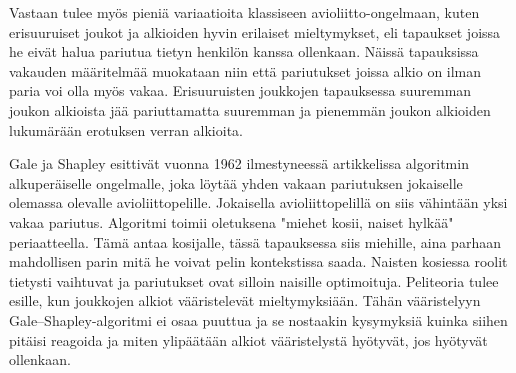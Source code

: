 \documentclass[finnish]{tktltiki2}
\theoremstyle{definition}
\theoremstyle{remark}
\begin{document}
Vastaan tulee myös pieniä variaatioita klassiseen avioliitto-ongelmaan, kuten erisuuruiset joukot ja alkioiden hyvin erilaiset mieltymykset, eli tapaukset joissa he eivät halua pariutua tietyn henkilön kanssa ollenkaan. Näissä tapauksissa vakauden määritelmää muokataan niin että pariutukset joissa alkio on ilman paria voi olla myös vakaa. Erisuuruisten joukkojen tapauksessa suuremman joukon alkioista jää pariuttamatta suuremman ja pienemmän joukon alkioiden lukumärään erotuksen verran alkioita.

Gale ja Shapley esittivät vuonna 1962 ilmestyneessä artikkelissa \cite{gale62a} algoritmin alkuperäiselle ongelmalle, joka löytää yhden vakaan pariutuksen jokaiselle olemassa olevalle avioliittopelille. Jokaisella avioliittopelillä on siis vähintään yksi vakaa pariutus. Algoritmi toimii oletuksena "miehet kosii, naiset hylkää" periaatteella. Tämä antaa kosijalle, tässä tapauksessa siis miehille, aina parhaan mahdollisen parin mitä he voivat pelin kontekstissa saada. Naisten kosiessa roolit tietysti vaihtuvat ja pariutukset ovat silloin naisille optimoituja.
Peliteoria tulee esille, kun joukkojen alkiot vääristelevät mieltymyksiään. Tähän vääristelyyn Gale--Shapley-algoritmi ei osaa puuttua ja se nostaakin kysymyksiä kuinka siihen pitäisi reagoida ja miten ylipäätään alkiot vääristelystä hyötyvät, jos hyötyvät ollenkaan.


%
%
% 
%



\end{document}
